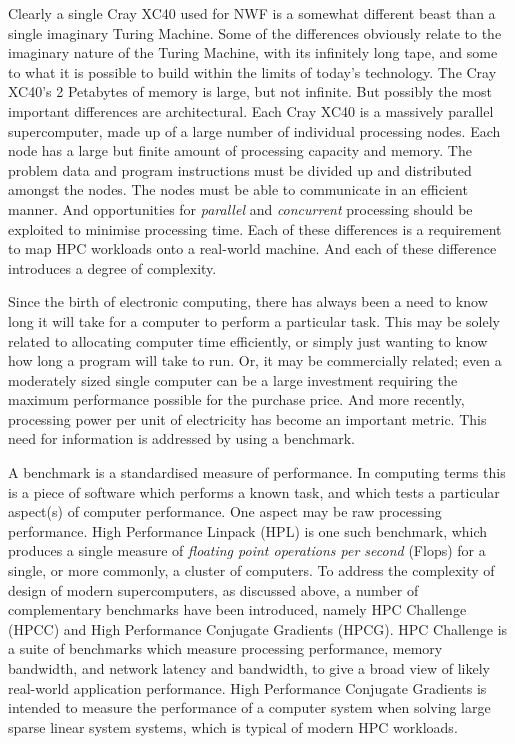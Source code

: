 Clearly a single Cray XC40 used for NWF is a somewhat different beast than a single imaginary Turing Machine. Some of the differences obviously relate to the imaginary nature of the Turing Machine, with its infinitely long tape, and some to what it is possible to build within the limits of today's technology. The Cray XC40's 2 Petabytes of memory is large, but not infinite. But possibly the most important differences are architectural. Each Cray XC40 is a massively parallel supercomputer, made up of a large number of individual processing nodes. Each node has a large but finite amount of processing capacity and memory. The problem data and program instructions must be divided up and distributed amongst the nodes. The nodes must be able to communicate in an efficient manner. And opportunities for \emph{parallel} and \emph{concurrent} processing should be exploited to minimise processing time. Each of these differences is a requirement to map HPC workloads onto a real-world machine. And each of these difference introduces a degree of complexity.   

Since the birth of electronic computing, there has always been a need to know long it will take for a computer to perform a particular task. This may be solely related to allocating computer time efficiently, or simply just wanting to know how long a program will take to run. Or, it may be commercially related; even a moderately sized single computer can be a large investment requiring the maximum performance possible for the purchase price. And more recently, processing power per unit of electricity has become an important metric. This need for information is addressed by using a benchmark.

A benchmark is a standardised measure of performance. In computing terms this is a piece of software which performs a known task, and which tests a particular aspect(s) of computer performance. One aspect may be raw processing performance. High Performance Linpack (HPL) is one such benchmark, which produces a single measure of \emph{floating point operations per second} (Flops) for a single, or more commonly, a cluster of computers. To address the complexity of design of modern supercomputers, as discussed above, a number of complementary benchmarks have been introduced, namely HPC Challenge (HPCC) and High Performance Conjugate Gradients (HPCG). HPC Challenge is a suite of benchmarks which measure processing performance, memory bandwidth, and network latency and bandwidth, to give a broad view of likely real-world application performance. High Performance Conjugate Gradients is intended to measure the performance of a computer system when solving large sparse linear system systems, which is typical of modern HPC workloads.

